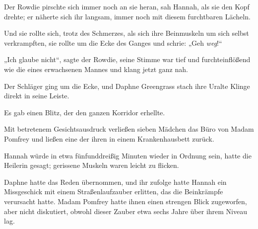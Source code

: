 Der Rowdie pirschte sich immer noch an sie heran, sah Hannah, als sie den Kopf drehte; er näherte sich ihr langsam, immer noch mit diesem furchtbaren Lächeln.

Und sie rollte sich, trotz des Schmerzes, als sich ihre Beinmuskeln um sich selbst verkrampften, sie rollte um die Ecke des Ganges und schrie: „Geh \emph{weg}!“

„Ich glaube nicht“, sagte der Rowdie, seine Stimme war tief und furchteinflößend wie die eines erwachsenen Mannes und klang jetzt ganz nah.

Der Schläger ging um die Ecke, und Daphne Greengrass stach ihre Uralte Klinge direkt in seine Leiste.

Es gab einen Blitz, der den ganzen Korridor erhellte.

\later

Mit betretenem Gesichtsausdruck verließen sieben Mädchen das Büro von Madam Pomfrey und ließen eine der ihren in einem Krankenhausbett zurück.

Hannah würde in etwa fünfunddreißig Minuten wieder in Ordnung sein, hatte die Heilerin gesagt; gerissene Muskeln waren leicht zu flicken.

Daphne hatte das Reden übernommen, und ihr zufolge hatte Hannah ein Missgeschick mit einem Straßenlaufzauber erlitten, das die Beinkrämpfe verursacht hatte. Madam Pomfrey hatte ihnen einen strengen Blick zugeworfen, aber nicht diskutiert, obwohl dieser Zauber etwa sechs Jahre über ihrem Niveau lag.

